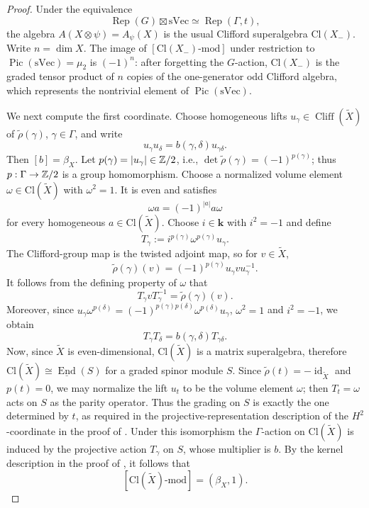 \documentclass[12pt]{amsart}
\numberwithin{equation}{section}
\providecommand{\k}{}\renewcommand{\k}{\mathbf{k}}
\providecommand{\sVec}{}\renewcommand{\sVec}{\mathrm{sVec}}
\providecommand{\Cl}{}\renewcommand{\Cl}{\mathrm{Cl}}
\providecommand{\id}{}\renewcommand{\id}{\operatorname{id}}
\theoremstyle{plain}
\theoremstyle{definition}
\theoremstyle{remark}
\begin{document}
\begin{proof} Under the equivalence
\[
\operatorname{Rep}(G)\boxtimes\sVec\simeq \operatorname{Rep}(\Gamma,t),
\]
the algebra $A(X\otimes\psi)=A_\psi(X)$ is the usual Clifford superalgebra $\Cl(X_-)$. 
Write $n=\dim X$. The image of $[\Cl(X_-)\text{-mod}]$ under restriction to $\operatorname{Pic}(\sVec)=\mu_2$ is $(-1)^n$: after forgetting the $G$-action, $\Cl(X_-)$ is the graded tensor product of $n$ copies of the one-generator odd Clifford algebra, which represents the nontrivial element of $\operatorname{Pic}(\sVec)$.

We next compute the first coordinate. Choose homogeneous lifts $u_\gamma\in\operatorname{Cliff}({\widetilde X})$ of $\widetilde\rho(\gamma)$, $\gamma\in\Gamma$, and write
\[
u_\gamma u_\delta=b(\gamma,\delta)u_{\gamma\delta}.
\]
Then $[b]=\beta_X$. Let $p(\gamma)=|u_\gamma|\in \Bbb Z/2$, i.e., $\det \widetilde \rho(\gamma)=(-1)^{p(\gamma)}$; thus $p: \Gamma\to \Bbb Z/2$ is a group homomorphism. Choose a normalized volume element $\omega\in\Cl({\widetilde X})$ with $\omega^2=1$. It is even and satisfies
\[
\omega a=(-1)^{|a|}a\omega
\]
for every homogeneous $a\in\Cl({\widetilde X})$. Choose $i\in\k$ with $i^2=-1$ and define
\[
T_\gamma:=i^{p(\gamma)}\omega^{p(\gamma)}u_\gamma.
\]
The Clifford-group map is the twisted adjoint map, so for $v\in {\widetilde X}$,
\[
\widetilde\rho(\gamma)(v)=(-1)^{p(\gamma)}u_\gamma vu_\gamma^{-1}.
\]
It follows from the defining property of $\omega$ that
\[
T_\gamma vT_\gamma^{-1}=\widetilde\rho(\gamma)(v).
\]
Moreover, since $u_\gamma\omega^{p(\delta)}=(-1)^{p(\gamma)p(\delta)}\omega^{p(\delta)}u_\gamma$, $\omega^2=1$ and $i^2=-1$, we obtain
\[
T_\gamma T_\delta=b(\gamma,\delta)T_{\gamma\delta}.
\]
Now, since $\widetilde X$ is even-dimensional, $\Cl({\widetilde X})$ is a matrix superalgebra, therefore $\Cl({\widetilde X})\cong\underline{\operatorname{End}}(S)$ for a graded spinor module $S$. Since $\widetilde\rho(t)=-\id_{\widetilde X}$ and $p(t)=0$, we may normalize the lift $u_t$ to be the volume element $\omega$; then $T_t=\omega$ acts on $S$ as the parity operator. Thus the grading on $S$ is exactly the one determined by $t$, as required in the projective-representation description of the $H^2$-coordinate in the proof of \cite[Theorem~6.5]{DN}.
 Under this isomorphism the $\Gamma$-action on $\Cl({\widetilde X})$ is induced by the projective action $T_\gamma$ on $S$, whose multiplier is $b$. By the kernel description in the proof of \cite[Theorem~6.5]{DN}, it follows that
\[
[\Cl({\widetilde X})\text{-mod}]=(\beta_X,1).
\]


\end{proof}
\end{document}
